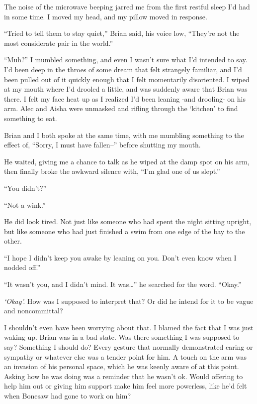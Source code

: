 





The noise of the microwave beeping jarred me from the first restful sleep I'd had in some time.  I moved my head, and my pillow moved in response.



``Tried to tell them to stay quiet,'' Brian said, his voice low, ``They're not the most considerate pair in the world.''



``Muh?'' I mumbled something, and even I wasn't sure what I'd intended to say.  I'd been deep in the throes of some dream that felt strangely familiar, and I'd been pulled out of it quickly enough that I felt momentarily disoriented.  I wiped at my mouth where I'd drooled a little, and was suddenly aware that Brian was there.  I felt my face heat up as I realized I'd been leaning -and drooling- on his arm.  Alec and Aisha were unmasked and rifling through the `kitchen' to find something to eat.



Brian and I both spoke at the same time, with me mumbling something to the effect of, ``Sorry, I must have fallen--'' before shutting my mouth.



He waited, giving me a chance to talk as he wiped at the damp spot on his arm, then finally broke the awkward silence with,  ``I'm glad one of us slept.''



``You didn't?''



``Not a wink.''



He did look tired.  Not just like someone who had spent the night sitting upright, but like someone who had just finished a swim from one edge of the bay to the other.



``I hope I didn't keep you awake by leaning on you.  Don't even know when I nodded off.''



``It wasn't you, and I didn't mind.  It was\ldots'' he searched for the word.  ``Okay.''



\emph{`Okay'.}  How was I supposed to interpret that?  Or did he intend for it to be vague and noncommittal?



I shouldn't even have been worrying about that.  I blamed the fact that I was just waking up.  Brian was in a bad state.  Was there something I was supposed to say?  Something I should do?  Every gesture that normally demonstrated caring or sympathy or whatever else was a tender point for him.  A touch on the arm was an invasion of his personal space, which he was keenly aware of at this point.  Asking how he was doing was a reminder that he wasn't ok.  Would offering to help him out or giving him support make him feel more powerless, like he'd felt when Bonesaw had gone to work on him?



